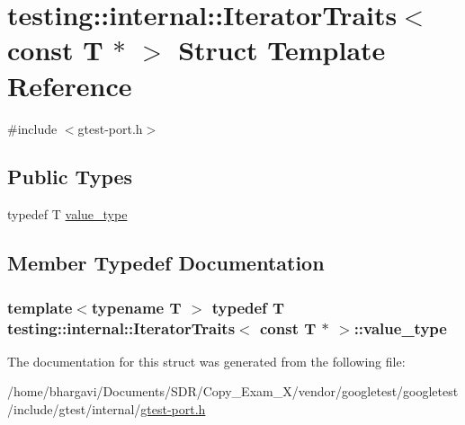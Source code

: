 \hypertarget{structtesting_1_1internal_1_1_iterator_traits_3_01const_01_t_01_5_01_4}{}\section{testing\+:\+:internal\+:\+:Iterator\+Traits$<$ const T $\ast$ $>$ Struct Template Reference}
\label{structtesting_1_1internal_1_1_iterator_traits_3_01const_01_t_01_5_01_4}


{\ttfamily \#include $<$gtest-\/port.\+h$>$}

\subsection*{Public Types}
\begin{DoxyCompactItemize}
\item 
typedef T \hyperlink{structtesting_1_1internal_1_1_iterator_traits_3_01const_01_t_01_5_01_4_ae7c8867223e106f374b56a7dc4a85547}{value\+\_\+type}
\end{DoxyCompactItemize}


\subsection{Member Typedef Documentation}
\subsubsection[{\texorpdfstring{value\+\_\+type}{value_type}}]{\setlength{\rightskip}{0pt plus 5cm}template$<$typename T $>$ typedef T {\bf testing\+::internal\+::\+Iterator\+Traits}$<$ const T $\ast$ $>$\+::{\bf value\+\_\+type}}\hypertarget{structtesting_1_1internal_1_1_iterator_traits_3_01const_01_t_01_5_01_4_ae7c8867223e106f374b56a7dc4a85547}{}\label{structtesting_1_1internal_1_1_iterator_traits_3_01const_01_t_01_5_01_4_ae7c8867223e106f374b56a7dc4a85547}


The documentation for this struct was generated from the following file\+:\begin{DoxyCompactItemize}
\item 
/home/bhargavi/\+Documents/\+S\+D\+R/\+Copy\+\_\+\+Exam\+\_\+X/vendor/googletest/googletest/include/gtest/internal/\hyperlink{gtest-port_8h}{gtest-\/port.\+h}\end{DoxyCompactItemize}
